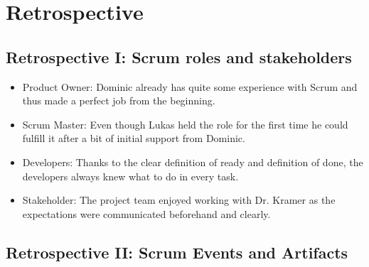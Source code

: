 \section{Retrospective}\label{sec:retrorespective}

\subsection{Retrospective I: Scrum roles and stakeholders}\label{subsec:retrospective-scrum-roles-and-stakeholder}

\begin{itemize}
    \item Product Owner: Dominic already has quite some experience with Scrum and thus made a perfect job from the beginning.
    \item Scrum Master: Even though Lukas held the role for the first time he could fulfill it after a bit of initial support from Dominic.
    \item Developers: Thanks to the clear definition of ready and definition of done, the developers always knew what to do in every task.
    \item Stakeholder: The project team enjoyed working with Dr. Kramer as the expectations were communicated beforehand and clearly.
\end{itemize}

\subsection{Retrospective II: Scrum Events and Artifacts}\label{subsec:retrospective-scrum-events-and-artifacts}

